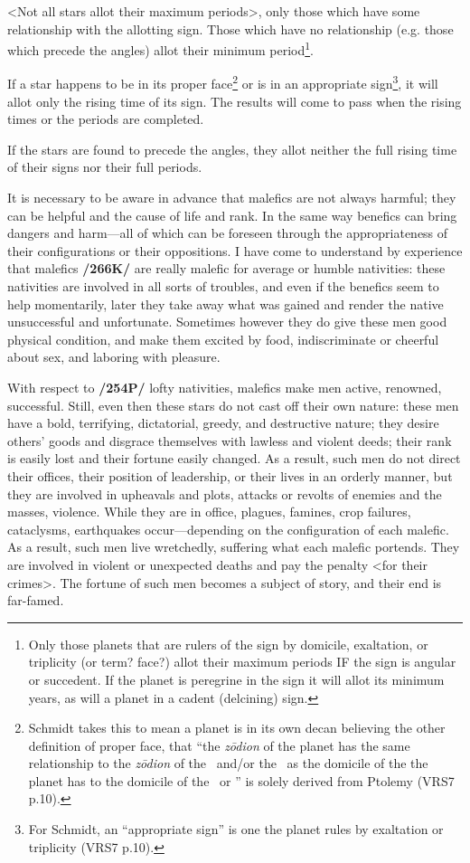 <Not  all stars allot their maximum periods>, only those which have some relationship with the allotting sign. Those which have no relationship (e.g. those which precede the angles) allot their minimum period\footnote{Only those planets that are rulers of the sign by domicile, exaltation, or triplicity (or term? face?) allot their maximum periods IF the sign is angular or succedent. If the planet is peregrine in the sign it will allot its minimum years, as will a planet in a cadent (delcining) sign.}.

If  a star happens to be in its proper face\footnote{Schmidt takes this to mean a planet is in its own decan believing the other definition of proper face, that ``the \textsl{z\={o}dion} of the planet has the same relationship to the \textsl{z\={o}dion} of the \Sun\, and/or the \Moon\, as the domicile of the the planet has to the domicile of the \Sun\, or \Moon'' is solely derived from Ptolemy  (VRS7 p.10).} or is in an appropriate sign\footnote{For Schmidt, an ``appropriate sign'' is one the planet rules by exaltation or triplicity (VRS7 p.10).}, it will allot only the rising time of its sign. The results will come to pass when the rising times or the periods are completed. 

If  the stars are found to precede the angles, they allot neither the full rising time of their signs nor their full periods.

It  is necessary to be aware in advance that malefics are not always harmful; they can be helpful and the cause of life and rank. In the same way benefics can bring dangers and harm—all of which can be foreseen through the appropriateness of their configurations or their oppositions. I have come to understand by experience that malefics \textbf{/266K/} are really malefic for average or humble nativities: these nativities are involved in all sorts of troubles, and even if the benefics seem to help momentarily, later they take away what was gained and render the native unsuccessful and unfortunate. Sometimes however they do give these men good physical condition, and make them excited by food, indiscriminate or cheerful about sex, and laboring with pleasure.

With respect to \textbf{/254P/} lofty nativities, malefics make men active, renowned, successful. Still, even then these stars do not cast off their own nature: these men have a bold, terrifying, dictatorial, greedy, and destructive nature; they desire others’ goods and disgrace themselves with lawless and violent deeds; their rank is easily lost and their fortune easily changed. As a result, such men do not direct their offices, their position of leadership, or their lives in an orderly manner, but they are involved in upheavals and plots, attacks or revolts of enemies and the masses, violence. While they are in office, plagues, famines, crop failures, cataclysms, earthquakes occur—depending on the configuration of each malefic. As a result, such men live wretchedly, suffering what each malefic portends. They are involved in violent or unexpected deaths and pay the penalty <for their crimes>. The fortune of such men becomes a subject of story, and
their end is far-famed. 

